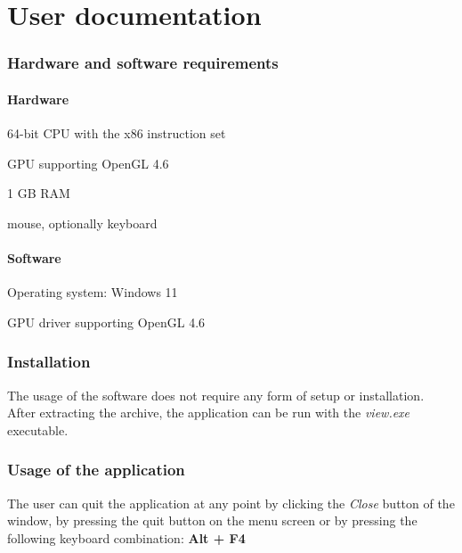 \part{User documentation}
\label{user}

\section{Hardware and software requirements}

\subsection{Hardware}

\begin{compactitem}
	\item 64-bit CPU with the x86 instruction set
	\item GPU supporting OpenGL 4.6
	\item 1 GB RAM
	\item mouse, optionally keyboard
\end{compactitem}

\subsection{Software}

\begin{compactitem}
	\item Operating system: Windows 11
	\item GPU driver supporting OpenGL 4.6
\end{compactitem}


\section{Installation}

The usage of the software does not require any form of setup or installation. After extracting the archive, the application can be run with the \textit{view.exe} executable.


\section{Usage of the application}
\label{user:usage}

The user can quit the application at any point by clicking the \textit{Close} button of the window, by pressing the quit button on the menu screen or by pressing the following keyboard combination: \textbf{Alt + F4}


